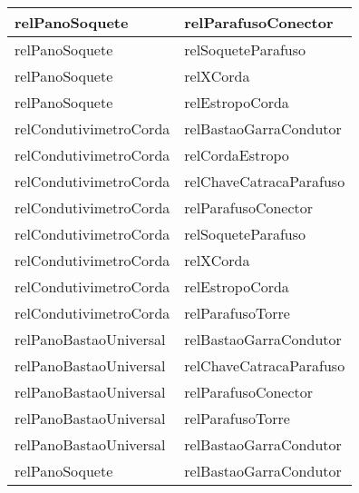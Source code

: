 \begin{center}
\begin{longtable}[H]{|l|l|}
relPanoSoquete                                  & relParafusoConector                              \\ \hline
relPanoSoquete                                  & relSoqueteParafuso                               \\ \hline
relPanoSoquete                                  & relXCorda                                        \\ \hline
relPanoSoquete                                  & relEstropoCorda                                  \\ \hline
relCondutivimetroCorda                          & relBastaoGarraCondutor                           \\ \hline
relCondutivimetroCorda                          & relCordaEstropo                                  \\ \hline
relCondutivimetroCorda                          & relChaveCatracaParafuso                          \\ \hline
relCondutivimetroCorda                          & relParafusoConector                              \\ \hline
relCondutivimetroCorda                          & relSoqueteParafuso                               \\ \hline
relCondutivimetroCorda                          & relXCorda                                        \\ \hline
relCondutivimetroCorda                          & relEstropoCorda                                  \\ \hline
relCondutivimetroCorda                          & relParafusoTorre                                 \\ \hline
relPanoBastaoUniversal                          & relBastaoGarraCondutor                           \\ \hline
relPanoBastaoUniversal                          & relChaveCatracaParafuso                          \\ \hline
relPanoBastaoUniversal                          & relParafusoConector                              \\ \hline
relPanoBastaoUniversal                          & relParafusoTorre                                 \\ \hline
relPanoBastaoUniversal                          & relBastaoGarraCondutor                           \\ \hline
relPanoSoquete                                  & relBastaoGarraCondutor                           \\ \hline

\end{longtable}
\end{center}
